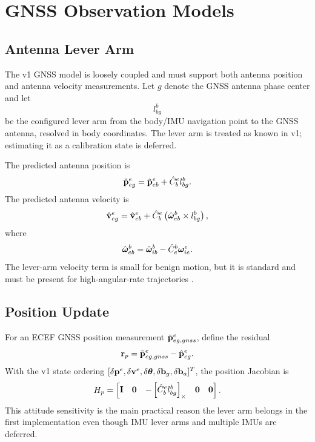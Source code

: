 \chapter{GNSS Observation Models}

\section{Antenna Lever Arm}

The v1 GNSS model is loosely coupled and must support both antenna position and
antenna velocity measurements. Let $g$ denote the GNSS antenna phase center and
let
\begin{equation}
l_{bg}^{b}
\end{equation}
be the configured lever arm from the body/IMU navigation point to the GNSS
antenna, resolved in body coordinates. The lever arm is treated as known in
v1; estimating it as a calibration state is deferred.

The predicted antenna position is
\begin{equation}
\hat{\mathbf{p}}_{eg}^{e}
=
\hat{\mathbf{p}}_{eb}^{e}
+
\hat{C}_b^e l_{bg}^{b}.
\label{eq:v1_gnss_pos_pred}
\end{equation}
The predicted antenna velocity is
\begin{equation}
\hat{\mathbf{v}}_{eg}^{e}
=
\hat{\mathbf{v}}_{eb}^{e}
+
\hat{C}_b^e
\left(
\hat{\boldsymbol{\omega}}_{eb}^{b}
\times
l_{bg}^{b}
\right),
\label{eq:v1_gnss_vel_pred}
\end{equation}
where
\begin{equation}
\hat{\boldsymbol{\omega}}_{eb}^{b}
=
\hat{\boldsymbol{\omega}}_{ib}^{b}
-
\hat{C}_e^b\boldsymbol{\omega}_{ie}^{e}.
\end{equation}
The lever-arm velocity term is small for benign motion, but it is standard and
must be present for high-angular-rate trajectories \cite{groves2013}.

\section{Position Update}

For an ECEF GNSS position measurement $\tilde{\mathbf{p}}_{eg,gnss}^{e}$, define the
residual
\begin{equation}
\mathbf{r}_p
=
\tilde{\mathbf{p}}_{eg,gnss}^{e}
-
\hat{\mathbf{p}}_{eg}^{e}.
\end{equation}
With the v1 state ordering
$[\delta\mathbf{p}^e,\delta\mathbf{v}^e,\delta\boldsymbol{\theta},\delta\mathbf{b}_g,\delta\mathbf{b}_a]^T$,
the position Jacobian is
\begin{equation}
H_p
=
\begin{bmatrix}
\mathbf{I} &
\mathbf{0} &
-\left[\hat{C}_b^e l_{bg}^{b}\right]_{\times} &
\mathbf{0} &
\mathbf{0}
\end{bmatrix}.
\label{eq:v1_gnss_pos_h}
\end{equation}
This attitude sensitivity is the main practical reason the lever arm belongs
in the first implementation even though IMU lever arms and multiple IMUs are
deferred.

